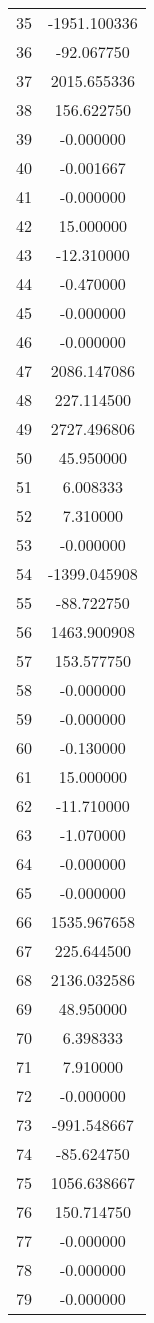 \documentclass[12pt]{article}
\begin{document}
\begin{longtable}{@{}cc@{}}
35 & -1951.100336 \\
36 & -92.067750 \\
37 & 2015.655336 \\
38 & 156.622750 \\
39 & -0.000000 \\
40 & -0.001667 \\
41 & -0.000000 \\
42 & 15.000000 \\
43 & -12.310000 \\
44 & -0.470000 \\
45 & -0.000000 \\
46 & -0.000000 \\
47 & 2086.147086 \\
48 & 227.114500 \\
49 & 2727.496806 \\
50 & 45.950000 \\
51 & 6.008333 \\
52 & 7.310000 \\
53 & -0.000000 \\
54 & -1399.045908 \\
55 & -88.722750 \\
56 & 1463.900908 \\
57 & 153.577750 \\
58 & -0.000000 \\
59 & -0.000000 \\
60 & -0.130000 \\
61 & 15.000000 \\
62 & -11.710000 \\
63 & -1.070000 \\
64 & -0.000000 \\
65 & -0.000000 \\
66 & 1535.967658 \\
67 & 225.644500 \\
68 & 2136.032586 \\
69 & 48.950000 \\
70 & 6.398333 \\
71 & 7.910000 \\
72 & -0.000000 \\
73 & -991.548667 \\
74 & -85.624750 \\
75 & 1056.638667 \\
76 & 150.714750 \\
77 & -0.000000 \\
78 & -0.000000 \\
79 & -0.000000 \\

\end{longtable}
\end{document}
